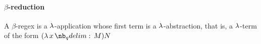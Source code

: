 \paragraph{\( \beta \)-reduction}

\begin{definition}\label{def:beta_redex}
  A \( \beta \)-regex is a \( \mathrm{\lambda} \)-application whose first term is a \( \mathrm{\lambda} \)-abstraction, that is, a \( \mathrm{\lambda} \)-term of the form \( (\qabs x M) N \)
\end{definition}
